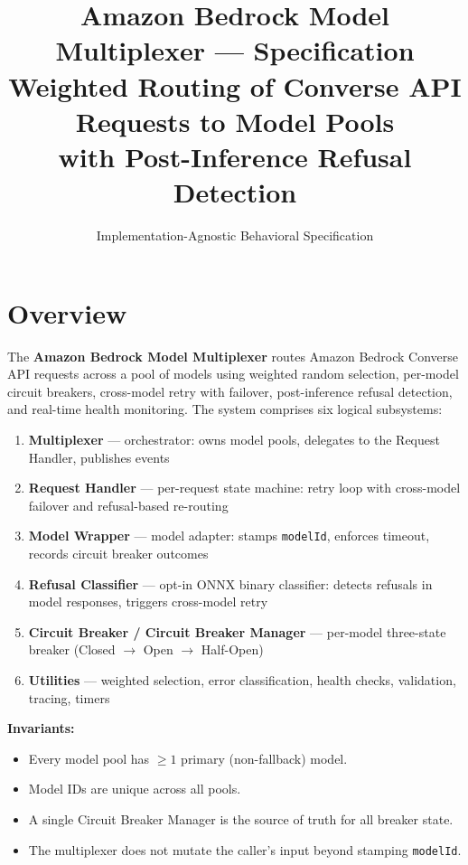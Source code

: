 \documentclass[10pt,letterpaper]{article}
\title{Amazon Bedrock Model Multiplexer --- Specification \\ \large Weighted Routing of Converse API Requests to Model Pools \\ \large with Post-Inference Refusal Detection}
\author{Implementation-Agnostic Behavioral Specification}
\date{}
\newcommand{\fld}[1]{\texttt{#1}}
\begin{document}
\maketitle
\thispagestyle{empty}

\section*{Overview}

The \textbf{Amazon Bedrock Model Multiplexer} routes Amazon Bedrock Converse API requests across a pool of models using weighted random selection, per-model circuit breakers, cross-model retry with failover, post-inference refusal detection, and real-time health monitoring. The system comprises six logical subsystems:

\begin{enumerate}[nosep]
  \item \textbf{Multiplexer} --- orchestrator: owns model pools, delegates to the Request Handler, publishes events
  \item \textbf{Request Handler} --- per-request state machine: retry loop with cross-model failover and refusal-based re-routing
  \item \textbf{Model Wrapper} --- model adapter: stamps \fld{modelId}, enforces timeout, records circuit breaker outcomes
  \item \textbf{Refusal Classifier} --- opt-in ONNX binary classifier: detects refusals in model responses, triggers cross-model retry
  \item \textbf{Circuit Breaker / Circuit Breaker Manager} --- per-model three-state breaker (Closed $\to$ Open $\to$ Half-Open)
  \item \textbf{Utilities} --- weighted selection, error classification, health checks, validation, tracing, timers
\end{enumerate}

\medskip
\noindent\textbf{Invariants:}
\begin{itemize}[nosep]
  \item Every model pool has $\ge 1$ primary (non-fallback) model.
  \item Model IDs are unique across all pools.
  \item A single Circuit Breaker Manager is the source of truth for all breaker state.
  \item The multiplexer does not mutate the caller's input beyond stamping \fld{modelId}.
\end{itemize}
\end{document}
